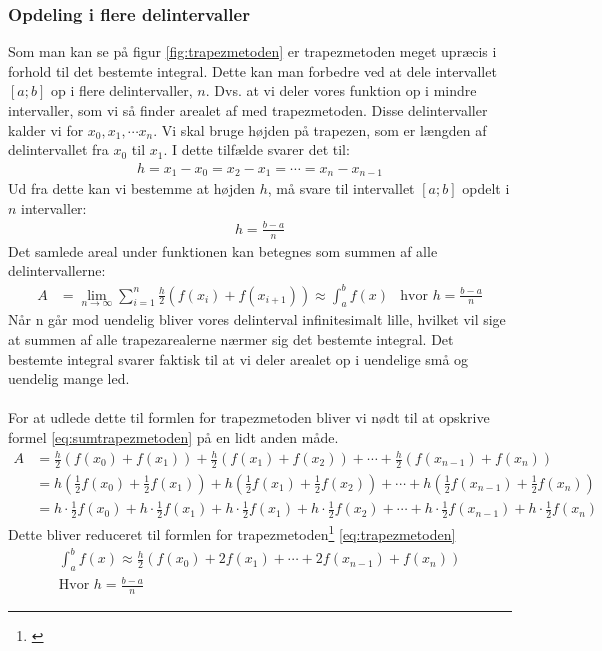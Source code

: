 \documentclass[12pt]{article}
\numberwithin{equation}{section}
\begin{document}
\subsubsection{Opdeling i flere delintervaller}
\label{sec:opdelingtrapezmetoden}
Som man kan se på figur \ref{fig:trapezmetoden} er trapezmetoden meget upræcis i forhold til det bestemte integral. Dette kan man forbedre ved at dele intervallet $[a;b]$ op i flere delintervaller, $n$. Dvs. at vi deler vores funktion op i mindre intervaller, som vi så finder arealet af med trapezmetoden. Disse delintervaller kalder vi for $x_0, x_1, \cdots x_n$. Vi skal bruge højden på trapezen, som er længden af delintervallet fra $x_0$ til $x_1$. I dette tilfælde svarer det til:
\begin{align}
h = x_1-x_0 = x_2-x_1 = \cdots = x_n - x_{n-1}
\end{align}
Ud fra dette kan vi bestemme at højden $h$, må svare til intervallet $[a;b]$ opdelt i $n$ intervaller:
\begin{align}
h=\frac{b-a}{n}
\end{align}
Det samlede areal under funktionen kan betegnes som summen af alle delintervallerne:
\begin{align}
\label{eq:sumtrapezmetoden}
A &= \lim\limits_{n \rightarrow \infty} \sum_{i=1}^{n} \frac{h}{2}(f(x_{i}) + f(x_{i+1}))
\approx \int_{a}^{b}f(x) &\text{hvor }h=\frac{b-a}{n}
\end{align}
Når n går mod uendelig bliver vores delinterval infinitesimalt lille, hvilket vil sige at summen af alle trapezarealerne nærmer sig det bestemte integral. Det bestemte integral svarer faktisk til at vi deler arealet op i uendelige små og uendelig mange led.
\\\\
For at udlede dette til formlen for trapezmetoden bliver vi nødt til at opskrive formel \eqref{eq:sumtrapezmetoden} på en lidt anden måde.
\begin{align}
A &= \frac{h}{2}(f(x_0)+ f(x_1)) + \frac{h}{2}(f(x_1)+ f(x_2)) + \cdots + \frac{h}{2}(f(x_{n-1})+ f(x_n)) \nonumber
\\ &= h(\frac{1}{2}f(x_0) + \frac{1}{2}f(x_1)) + h(\frac{1}{2}f(x_1) + \frac{1}{2}f(x_2)) + \cdots + h(\frac{1}{2}f(x_{n-1}) + \frac{1}{2}f(x_n)) \nonumber
\\ &= h \cdot \frac{1}{2}f(x_0) + h \cdot \frac{1}{2}f(x_1) + h \cdot \frac{1}{2}f(x_1) + h \cdot \frac{1}{2}f(x_2) + \cdots + h \cdot \frac{1}{2}f(x_{n-1}) + h \cdot \frac{1}{2}f(x_n) \nonumber
\end{align}
Dette bliver reduceret til formlen for trapezmetoden\footnote{\cite[s. 14]{2012matA}} \eqref{eq:trapezmetoden}
\begin{align}
\label{eq:trapezmetoden}
\boxed{\int_{a}^{b}f(x) \approx \frac{h}{2}(f(x_0) + 2f(x_1) + \cdots + 2f(x_{n-1}) + f(x_n))} \\ \text{Hvor } h=\frac{b-a}{n} \nonumber
\end{align}
\end{document}
